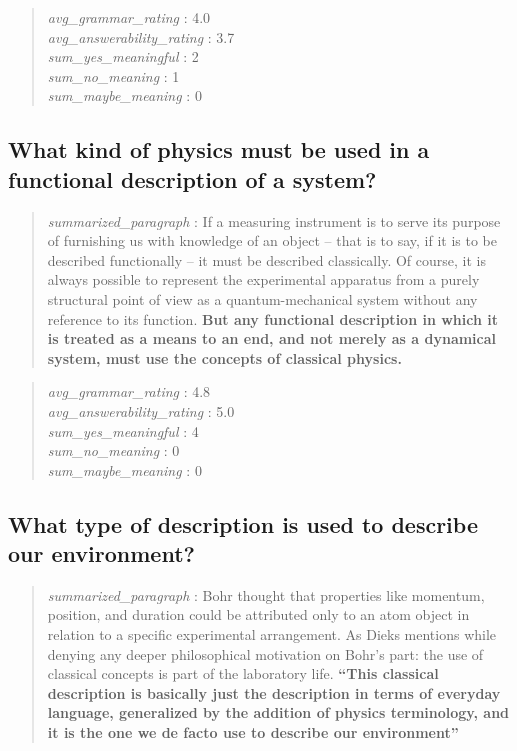 \begin{quote}
\emph{avg\_grammar\_rating} : 4.0\\
\emph{avg\_answerability\_rating} : 3.7\\
\emph{sum\_yes\_meaningful} : 2\\
\emph{sum\_no\_meaning} : 1\\
\emph{sum\_maybe\_meaning} : 0
\end{quote}

\hypertarget{what-kind-of-physics-must-be-used-in-a-functional-description-of-a-system}{%
\subsection{What kind of physics must be used in a functional
description of a
system?}\label{what-kind-of-physics-must-be-used-in-a-functional-description-of-a-system}}

\begin{quote}
\emph{summarized\_paragraph} : If a measuring instrument is to serve its
purpose of furnishing us with knowledge of an object -- that is to say,
if it is to be described functionally -- it must be described
classically. Of course, it is always possible to represent the
experimental apparatus from a purely structural point of view as a
quantum-mechanical system without any reference to its function.
\textbf{But any functional description in which it is treated as a means
to an end, and not merely as a dynamical system, must use the concepts
of classical physics.}
\end{quote}

\begin{quote}
\emph{avg\_grammar\_rating} : 4.8\\
\emph{avg\_answerability\_rating} : 5.0\\
\emph{sum\_yes\_meaningful} : 4\\
\emph{sum\_no\_meaning} : 0\\
\emph{sum\_maybe\_meaning} : 0
\end{quote}

\hypertarget{what-type-of-description-is-used-to-describe-our-environment}{%
\subsection{What type of description is used to describe our
environment?}\label{what-type-of-description-is-used-to-describe-our-environment}}

\begin{quote}
\emph{summarized\_paragraph} : Bohr thought that properties like
momentum, position, and duration could be attributed only to an atom
object in relation to a specific experimental arrangement. As Dieks
mentions while denying any deeper philosophical motivation on Bohr's
part: the use of classical concepts is part of the laboratory life.
\textbf{``This classical description is basically just the description
in terms of everyday language, generalized by the addition of physics
terminology, and it is the one we de facto use to describe our
environment''}
\end{quote}

